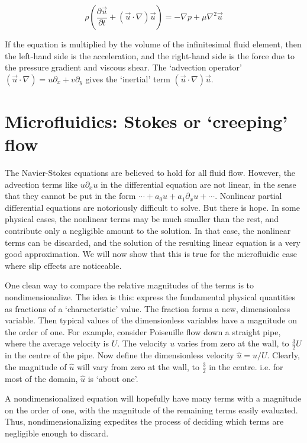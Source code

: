 \documentclass[a4paper]{report}
\begin{document}
\begin{equation}
\rho \left( \frac{\partial \vec{u}}{\partial t} + (\vec{u}\cdot \nabla)\vec{u} \right) = -\nabla p +  \mu \nabla^2 \vec{u}
\end{equation}

If the equation is multiplied by the volume of the infinitesimal fluid element, then
the left-hand side is the acceleration, and the right-hand side is the force due to the pressure gradient and viscous shear.  The `advection operator'\\
 $(\vec{u} \cdot \nabla ) = u \partial_x + v \partial_y $
 gives the `inertial' term  $ (\vec{u}\cdot \nabla)\vec{u} $.

\section*{Microfluidics: Stokes or `creeping' flow}


The Navier-Stokes equations are believed to hold for all fluid flow.  However, the advection terms like $u \partial_x u$ in the differential equation are not linear, in the sense
that they cannot be put in the form $\dotsb + a_0 u + a_1 \partial_x u + \dotsb$.  Nonlinear partial differential equations are notoriously difficult to solve.  But there is hope.  In some physical cases, the nonlinear terms may be much smaller than the rest, and contribute only a negligible amount to the solution.  In that case, the nonlinear terms can be discarded, and the solution of the resulting linear equation is a very good approximation.  We will now show that this is true for the microfluidic case where slip effects are noticeable.

One clean way to compare the relative magnitudes of the terms is to nondimensionalize. The idea is this: express the fundamental physical quantities as fractions of a `characteristic' value. The fraction forms a new, dimensionless variable. Then typical values of the dimensionless variables have a magnitude on the order of one.  For example, consider Poiseuille flow down a straight pipe, where the average velocity is $U$.  The velocity $u$ varies from zero at the wall, to  $\frac{3}{2} U$ in the centre of the pipe.  Now define the dimensionless velocity $\hat{u} = u/U$.  Clearly, the magnitude of $\hat{u}$ will vary from zero at the wall, to $\frac{3}{2}$ in the centre. i.e. for most of the domain, $\hat{u}$ is `about one'.

A nondimensionalized equation will hopefully have many terms with a magnitude on the order of one, with the magnitude of the remaining terms easily evaluated.  Thus, nondimensionalizing expedites the process of deciding which terms are negligible enough to discard.
\end{document}
